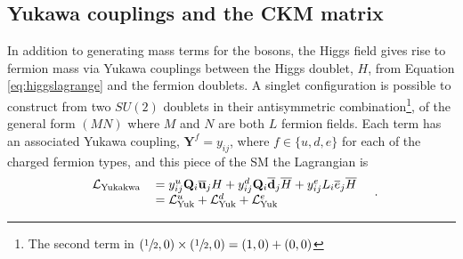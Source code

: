 \subsection{Yukawa couplings and the CKM matrix}
 In addition to generating mass terms for the bosons,
  the Higgs field gives rise to fermion mass 
  via Yukawa couplings between the Higgs doublet, $H$,
  from Equation \ref{eq:higgslagrange} and the 
  fermion doublets.
 A singlet configuration is possible
  to construct from two $SU(2)$ doublets
  in their antisymmetric combination\footnote{ 
  The second term in $(\sfrac{1}{2},0)\times(\sfrac{1}{2},0) = (1,0) + (0,0)$},
  of the general form $(MN)$ where $M$ and $N$ are
  both $L$ fermion fields.
 Each term has an associated Yukawa coupling, $\mathbf{Y}^{f}=y_{ij}$,
  where $f\in\{u,d,e\}$ for each of the
  charged fermion types,
  and this piece of the SM the Lagrangian is
\begin{equation}\label{eq:yukawalagrange}
\begin{tabular}{rl}
 $ \mathcal{L}_{\mathrm{Yukakwa}} $ & $
  = y_{ij}^{u} \mathbf{Q}_i\overline{\mathbf{u}}_j H
  + y_{ij}^{d} \mathbf{Q}_i\overline{\mathbf{d}}_j \overline{H}
  + y_{ij}^{e} L_i\overline{e}_j \overline{H} $
\\
 {} & $ = \mathcal{L}_{\mathrm{Yuk}}^{u} 
        + \mathcal{L}_{\mathrm{Yuk}}^{d}
        + \mathcal{L}_{\mathrm{Yuk}}^{e} $
\end{tabular} \;\;\;.
\end{equation}
 
